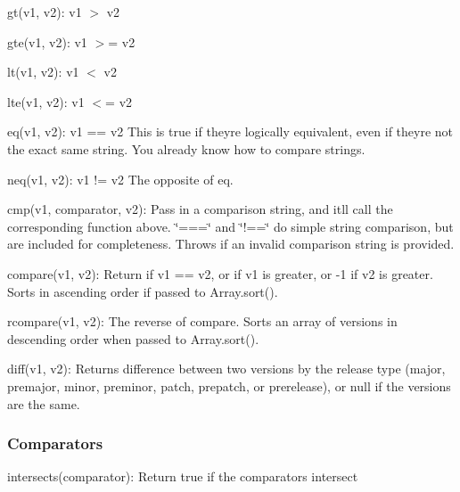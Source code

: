 \begin{DoxyItemize}
\item {\ttfamily gt(v1, v2)}\+: {\ttfamily v1 $>$ v2}
\item {\ttfamily gte(v1, v2)}\+: {\ttfamily v1 $>$= v2}
\item {\ttfamily lt(v1, v2)}\+: {\ttfamily v1 $<$ v2}
\item {\ttfamily lte(v1, v2)}\+: {\ttfamily v1 $<$= v2}
\item {\ttfamily eq(v1, v2)}\+: {\ttfamily v1 == v2} This is true if they\textquotesingle{}re logically equivalent, even if they\textquotesingle{}re not the exact same string. You already know how to compare strings.
\item {\ttfamily neq(v1, v2)}\+: {\ttfamily v1 != v2} The opposite of {\ttfamily eq}.
\item {\ttfamily cmp(v1, comparator, v2)}\+: Pass in a comparison string, and it\textquotesingle{}ll call the corresponding function above. {\ttfamily \char`\"{}===\char`\"{}} and {\ttfamily \char`\"{}!==\char`\"{}} do simple string comparison, but are included for completeness. Throws if an invalid comparison string is provided.
\item {\ttfamily compare(v1, v2)}\+: Return {} if {\ttfamily v1 == v2}, or {} if {\ttfamily v1} is greater, or {\ttfamily -\/1} if {\ttfamily v2} is greater. Sorts in ascending order if passed to {\ttfamily Array.\+sort()}.
\item {\ttfamily rcompare(v1, v2)}\+: The reverse of compare. Sorts an array of versions in descending order when passed to {\ttfamily Array.\+sort()}.
\item {\ttfamily diff(v1, v2)}\+: Returns difference between two versions by the release type ({\ttfamily major}, {\ttfamily premajor}, {\ttfamily minor}, {\ttfamily preminor}, {\ttfamily patch}, {\ttfamily prepatch}, or {\ttfamily prerelease}), or null if the versions are the same.
\end{DoxyItemize}

\subsubsection*{Comparators}


\begin{DoxyItemize}
\item {\ttfamily intersects(comparator)}\+: Return true if the comparators intersect
\end{DoxyItemize}

